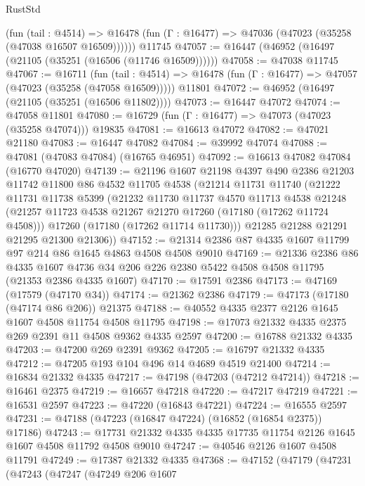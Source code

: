 \begin{lexlean}{RustStd}
\begin{coremodule}
      (fun (tail : @4514) =>
      @16478 (fun (Γ : @16477) => @47036 (@47023 (@35258 (@47038 @16507 @16509))))))
    @11745
@47057 := @16447 (@46952 (@16497 (@21105 (@35251 (@16506 (@11746 @16509))))))
@47058 := @47038 @11745
@47067 := @16711
    (fun (tail : @4514) => @16478 (fun (Γ : @16477) => @47057 (@47023 (@35258 (@47058 @16509)))))
    @11801
@47072 := @46952 (@16497 (@21105 (@35251 (@16506 @11802))))
@47073 := @16447 @47072
@47074 := @47058 @11801
@47080 := @16729 (fun (Γ : @16477) => @47073 (@47023 (@35258 @47074))) @19835
@47081 := @16613 @47072
@47082 := @47021 @21180
@47083 := @16447 @47082
@47084 := @39992 @47074
@47088 := @47081 (@47083 @47084) (@16765 @46951)
@47092 := @16613 @47082 @47084 (@16770 @47020)
@47139 := @21196
    @1607
    @21198
    @4397
    @490
    @2386
    @21203
    @11742
    @11800
    @86
    @4532
    @11705
    @4538
    (@21214
      @11731
      @11740
      (@21222
        @11731
        @11738
        @5399
        (@21232
          @11730
          @11737
          @4570
          @11713
          @4538
          @21248
          (@21257 @11723 @4538 @21267 @21270 @17260 (@17180 (@17262 @11724 @4508)))
          @17260
          (@17180 (@17262 @11714 @11730)))
        @21285
        @21288
        @21291
        @21295
        @21300
        @21306))
@47152 := @21314 @2386 @87 @4335 @1607 @11799 @97 @214 @86 @1645 @4863 @4508 @4508 @9010
@47169 := @21336
    @2386
    @86
    @4335
    @1607
    @4736
    @34
    @206
    @226
    @2380
    @5422
    @4508
    @4508
    @11795
    (@21353 @2386 @4335 @1607)
@47170 := @17591 @2386
@47173 := @47169 (@17579 (@47170 @34))
@47174 := @21362 @2386
@47179 := @47173 (@17180 (@47174 @86 @206)) @21375
@47188 := @40552 @4335 @2377 @2126 @1645 @1607 @4508 @11754 @4508 @11795
@47198 := @17073 @21332 @4335 @2375 @269 @2391 @11 @4508 @9362 @4335 @2597
@47200 := @16788 @21332 @4335
@47203 := @47200 @269 @2391 @9362
@47205 := @16797 @21332 @4335
@47212 := @47205 @193 @104 @496 @14 @4689 @4519 @21400
@47214 := @16834 @21332 @4335
@47217 := @47198 (@47203 (@47212 @47214))
@47218 := @16461 @2375
@47219 := @16657 @47218
@47220 := @47217 @47219
@47221 := @16531 @2597
@47223 := @47220 (@16843 @47221)
@47224 := @16555 @2597
@47231 := @47188 (@47223 (@16847 @47224) (@16852 (@16854 @2375)) @17186)
@47243 := @17731 @21332 @4335 @4335 @17735 @11754 @2126 @1645 @1607 @4508 @11792 @4508 @9010
@47247 := @40546 @2126 @1607 @4508 @11791
@47249 := @17387 @21332 @4335
@47368 := @47152
    (@47179
      (@47231
        (@47243
          (@47247
            (@47249
              @206
              @1607

\end{coremodule}
\end{lexlean}
